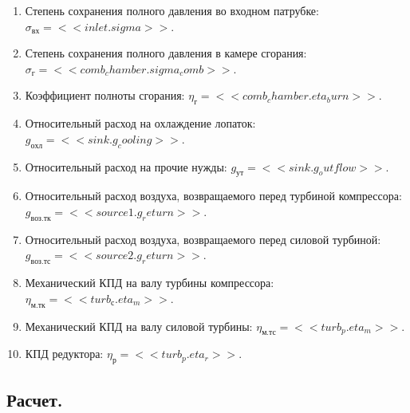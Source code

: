 \begin{enumerate}
	\item Степень сохранения полного давления во входном патрубке: $\sigma_{вх} = << inlet.sigma >>$.
	\item Степень сохранения полного давления в камере сгорания: $\sigma_г = << comb_chamber.sigma_comb >>$.
	\item Коэффициент полноты сгорания: $\eta_г = << comb_chamber.eta_burn >> $. 
	\item Относительный расход на охлаждение лопаток: $g_{охл} = << sink.g_cooling >>$.
	\item Относительный расход на прочие нужды: $g_{ут} = << sink.g_outflow >>$.
	\item Относительный расход воздуха, возвращаемого перед турбиной компрессора: $g_{воз.тк} = << source1.g_return >>$.
	\item Относительный расход воздуха, возвращаемого перед силовой турбиной: $g_{воз.тс} = << source2.g_return >>$.
	\item Механический КПД на валу турбины компрессора: $\eta_{м.тк} = << turb_с.eta_m >>$.
	\item Механический КПД на валу силовой турбины: $\eta_{м.тс} = << turb_p.eta_m >>$.
	\item КПД редуктора: $ \eta_р = << turb_p.eta_r >>$.

\end{enumerate}

\subsection{Расчет.}


